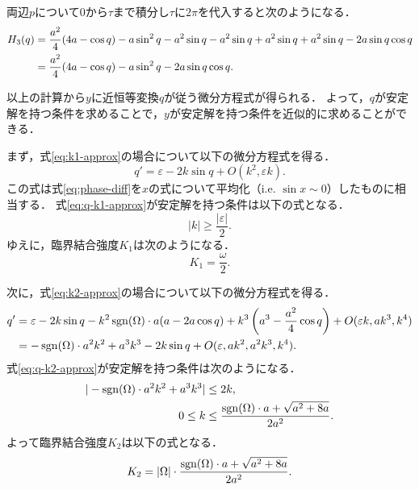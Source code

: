 \documentclass[../main]{subfiles}
\begin{document}
    両辺$p$について$0$から$\tau$まで積分し$\tau$に$2\pi$を代入すると次のようになる．
    \begin{align}
        H_3(q)&=\frac{a^2}{4}(4a-\cos q)-a\sin^2 q-a^2\sin q-a^2\sin q+a^2\sin q+a^2\sin q-2a\sin q\cos q\notag\\
        &=\frac{a^2}{4}(4a-\cos q)-a\sin^2 q-2a\sin q\cos q.
        \label{eq:H3-approx}
    \end{align}

    以上の計算から$y$に近恒等変換$q$が従う微分方程式が得られる．
    よって，$q$が安定解を持つ条件を求めることで，$y$が安定解を持つ条件を近似的に求めることができる．
    
    まず，式\eqref{eq:k1-approx}の場合について以下の微分方程式を得る．
    \begin{equation}
        q'=\varepsilon-2k\sin q+O(k^2,\varepsilon k).
        \label{eq:q-k1-approx}
    \end{equation}
    この式は式\eqref{eq:phase-diff}を$x$の式について平均化（i.e. $\sin x\sim 0$）したものに相当する．
    式\eqref{eq:q-k1-approx}が安定解を持つ条件は以下の式となる．
    \begin{equation}
        |k|\geq\frac{|\varepsilon|}{2}.
    \end{equation}
    ゆえに，臨界結合強度$K_1$は次のようになる．
    \begin{equation}
        \label{eq:K1-approx}
        K_1=\frac{\omega}{2}.
    \end{equation}

    次に，式\eqref{eq:k2-approx}の場合について以下の微分方程式を得る．
    \begin{align}
        \label{eq:q-k2-approx}
        \begin{split}
            q'&=\varepsilon-2k\sin q-k^2\operatorname{sgn}(\Omega)\cdot a(a-2a\cos  q)+k^3\left(a^3-\frac{a^2}{4}\cos q\right)+O(\varepsilon k,ak^3,k^4)\\
            &=-\operatorname{sgn}(\Omega)\cdot a^2k^2+a^3k^3-2k\sin q+O(\varepsilon,ak^2,a^2k^3,k^4).
        \end{split}
    \end{align}
    式\eqref{eq:q-k2-approx}が安定解を持つ条件は次のようになる．
    \begin{align}
        |-\operatorname{sgn}(\Omega)\cdot a^2k^2+a^3k^3|&\leq 2k,\notag\\
        0\leq k&\leq \frac{\operatorname{sgn}(\Omega) \cdot a+\sqrt{a^2+8a}}{2a^2}.
    \end{align}
    よって臨界結合強度$K_2$は以下の式となる．
    \begin{equation}
        \label{eq:K2-approx}
        K_2=|\Omega|\cdot\frac{\operatorname{sgn}(\Omega) \cdot a+\sqrt{a^2+8a}}{2a^2}.
    \end{equation}
\end{document}
